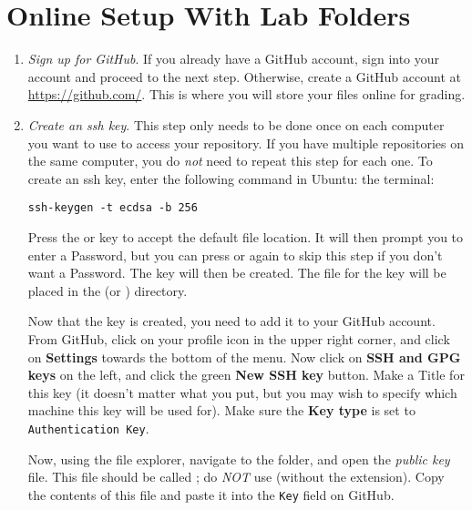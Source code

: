 \section*{Online Setup With Lab Folders}
\begin{enumerate}
    \item \emph{Sign up for GitHub}.
    \label{step:sign-up}
    If you already have a GitHub account, sign into your account and proceed to the next step.
    Otherwise, create a GitHub account at \url{https://github.com/}.
    This is where you will store your files online for grading.
  

    \item \emph{Create an ssh key}.
    This step only needs to be done once on each computer you want to use to access your repository.
    If you have multiple repositories on the same computer, you do \emph{not} need to repeat this step for each one.
    To create an ssh key, enter the following command in
    \ifwindows
    Ubuntu:
    \else
    the terminal:
    \fi
\begin{lstlisting}
ssh-keygen -t ecdsa -b 256
\end{lstlisting}
    Press the  or  key to accept the default file location.
    It will then prompt you to enter a Password, but you can press  or  again to skip this step if you don't want a Password.
    The key will then be created.
    The file for the key will be placed in the  (or ) directory.
  
    Now that the key is created, you need to add it to your GitHub account.
    From GitHub, click on your profile icon in the upper right corner, and click on \textbf{Settings} towards the bottom of the menu.
    Now click on \textbf{SSH and GPG keys} on the left, and click the green \textbf{New SSH key} button.
    Make a Title for this key (it doesn't matter what you put, but you may wish to specify which machine this key will be used for).
    Make sure the \textbf{Key type} is set to \texttt{Authentication Key}.

    Now, using the file explorer, navigate to the  folder, and open the \emph{public key} file.
    This file should be called ; do \emph{NOT} use  (without the  extension).
    Copy the contents of this file and paste it into the \texttt{Key} field on GitHub. 


\end{enumerate}
